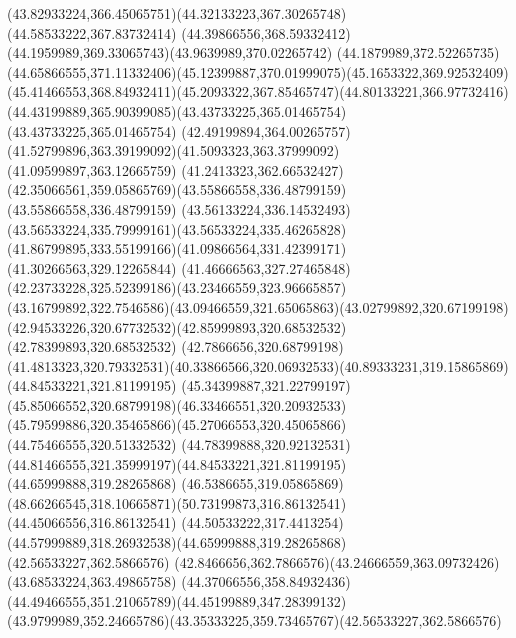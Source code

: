 {{\curveto(43.82933224,366.45065751)(44.32133223,367.30265748)(44.58533222,367.83732414)
\curveto(44.39866556,368.59332412)(44.1959989,369.33065743)(43.9639989,370.02265742)
\lineto(44.1879989,372.52265735)
\curveto(44.65866555,371.11332406)(45.12399887,370.01999075)(45.1653322,369.92532409)
\curveto(45.41466553,368.84932411)(45.2093322,367.85465747)(44.80133221,366.97732416)
\curveto(44.43199889,365.90399085)(43.43733225,365.01465754)(43.43733225,365.01465754)
\curveto(42.49199894,364.00265757)(41.52799896,363.39199092)(41.5093323,363.37999092)
\lineto(41.09599897,363.12665759)
\lineto(41.2413323,362.66532427)
\curveto(42.35066561,359.05865769)(43.55866558,336.48799159)(43.55866558,336.48799159)
\curveto(43.56133224,336.14532493)(43.56533224,335.79999161)(43.56533224,335.46265828)
\curveto(41.86799895,333.55199166)(41.09866564,331.42399171)(41.30266563,329.12265844)
\curveto(41.46666563,327.27465848)(42.23733228,325.52399186)(43.23466559,323.96665857)
\curveto(43.16799892,322.7546586)(43.09466559,321.65065863)(43.02799892,320.67199198)
\curveto(42.94533226,320.67732532)(42.85999893,320.68532532)(42.78399893,320.68532532)
\lineto(42.7866656,320.68799198)
\curveto(41.4813323,320.79332531)(40.33866566,320.06932533)(40.89333231,319.15865869)
\moveto(44.84533221,321.81199195)
\curveto(45.34399887,321.22799197)(45.85066552,320.68799198)(46.33466551,320.20932533)
\curveto(45.79599886,320.35465866)(45.27066553,320.45065866)(44.75466555,320.51332532)
\curveto(44.78399888,320.92132531)(44.81466555,321.35999197)(44.84533221,321.81199195)
\moveto(44.65999888,319.28265868)
\curveto(46.5386655,319.05865869)(48.66266545,318.10665871)(50.73199873,316.86132541)
\lineto(44.45066556,316.86132541)
\curveto(44.50533222,317.4413254)(44.57999889,318.26932538)(44.65999888,319.28265868)
\moveto(42.56533227,362.5866576)
\curveto(42.8466656,362.7866576)(43.24666559,363.09732426)(43.68533224,363.49865758)
\curveto(44.37066556,358.84932436)(44.49466555,351.21065789)(44.45199889,347.28399132)
\curveto(43.9799989,352.24665786)(43.35333225,359.73465767)(42.56533227,362.5866576)
}
}
